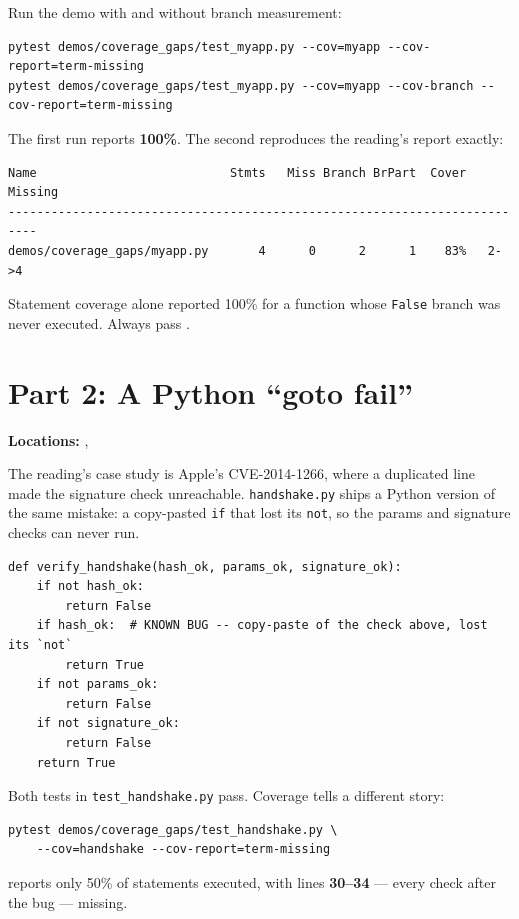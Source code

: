 \documentclass[11pt]{article}
\begin{document}
Run the demo with and without branch measurement:
\begin{lstlisting}[style=shellstyle]
pytest demos/coverage_gaps/test_myapp.py --cov=myapp --cov-report=term-missing
pytest demos/coverage_gaps/test_myapp.py --cov=myapp --cov-branch --cov-report=term-missing
\end{lstlisting}
The first run reports \textbf{100\%}. The second reproduces the
reading's report exactly:
\begin{lstlisting}[style=shellstyle]
Name                           Stmts   Miss Branch BrPart  Cover   Missing
--------------------------------------------------------------------------
demos/coverage_gaps/myapp.py       4      0      2      1    83%   2->4
\end{lstlisting}

\begin{warningbox}
Statement coverage alone reported 100\% for a function whose
\texttt{False} branch was never executed. Always pass
.
\end{warningbox}

\section{Part 2: A Python ``goto fail''}
\textbf{Locations:} ,

The reading's case study is Apple's CVE-2014-1266, where a duplicated
line made the signature check unreachable. \texttt{handshake.py} ships a
Python version of the same mistake: a copy-pasted \texttt{if} that lost
its \texttt{not}, so the params and signature checks can never run.

\begin{lstlisting}
def verify_handshake(hash_ok, params_ok, signature_ok):
    if not hash_ok:
        return False
    if hash_ok:  # KNOWN BUG -- copy-paste of the check above, lost its `not`
        return True
    if not params_ok:
        return False
    if not signature_ok:
        return False
    return True
\end{lstlisting}

Both tests in \texttt{test\_handshake.py} pass. Coverage tells a
different story:
\begin{lstlisting}[style=shellstyle]
pytest demos/coverage_gaps/test_handshake.py \
    --cov=handshake --cov-report=term-missing
\end{lstlisting}
reports only 50\% of statements executed, with lines \textbf{30--34} ---
every check after the bug --- missing.
\end{document}

